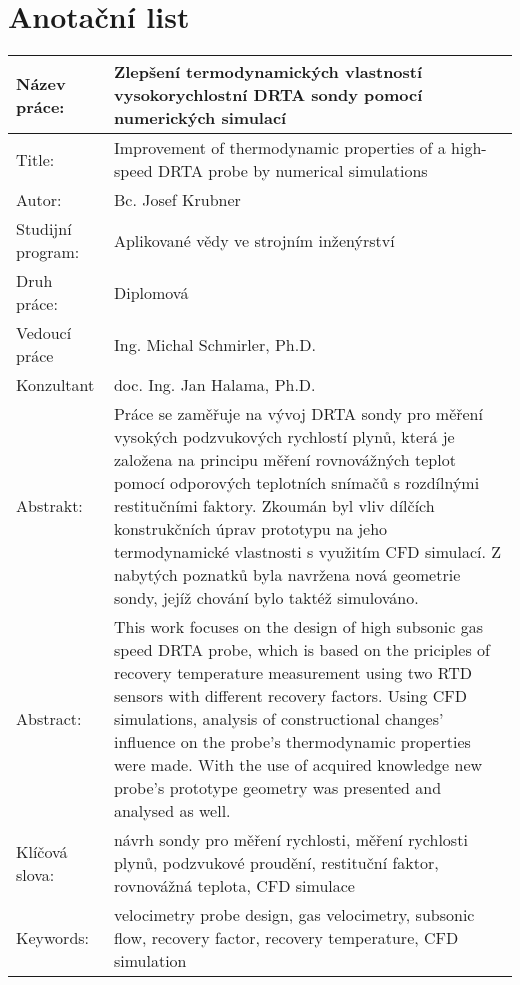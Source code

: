 \thispagestyle{empty}
\section*{Anotační list}
\def\arraystretch{2}%
\begin{table}[ht!]
    \centering
    \begin{tabular}{p{}|p{}}
    Název práce: & Zlepšení termodynamických vlastností vysokorychlostní DRTA sondy pomocí numerických simulací \\ \hline
    Title: & Improvement of thermodynamic properties of a high-speed DRTA probe by numerical simulations \\ \hline
    Autor: & Bc. Josef Krubner \\ \hline
    Studijní program: & Aplikované vědy ve strojním inženýrství \\ \hline
    Druh práce: & Diplomová \\ \hline
    Vedoucí práce & Ing. Michal Schmirler, Ph.D. \\ \hline
    Konzultant & doc. Ing. Jan Halama, Ph.D. \\ \hline
    Abstrakt: & Práce se zaměřuje na vývoj DRTA sondy pro měření vysokých podzvukových rychlostí plynů, která je založena na principu měření rovnovážných teplot pomocí odporových teplotních snímačů s rozdílnými restitučními faktory. Zkoumán byl vliv dílčích konstrukčních úprav prototypu na jeho termodynamické vlastnosti s využitím CFD simulací. Z nabytých poznatků byla navržena nová geometrie sondy, jejíž chování bylo taktéž simulováno. \\ \hline
    Abstract: & This work focuses on the design of high subsonic gas speed DRTA probe, which is based on the priciples of recovery temperature measurement using two RTD sensors with different recovery factors. Using CFD simulations, analysis of constructional changes' influence on the probe's thermodynamic properties were made. With the use of acquired knowledge new probe's prototype geometry was presented and analysed as well.  \\ \hline
    Klíčová slova: & návrh sondy pro měření rychlosti, měření rychlosti plynů, podzvukové proudění, restituční faktor, rovnovážná teplota, CFD simulace\\ \hline
    Keywords: & velocimetry probe design, gas velocimetry, subsonic flow, recovery factor, recovery temperature, CFD simulation
    \end{tabular}
\end{table}
\def\arraystretch{1}%